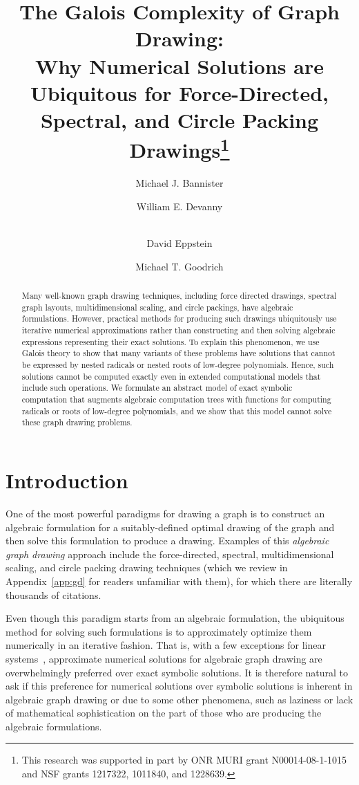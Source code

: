 \documentclass[oribibl,10pt]{llncs}
\title{The Galois Complexity of Graph Drawing:\\ 
Why Numerical Solutions are Ubiquitous
for Force-Directed, Spectral, and Circle Packing Drawings\thanks{This research was supported in part by ONR MURI grant N00014-08-1-1015 and NSF grants 1217322, 1011840, and 1228639.}}
\author{Michael J. Bannister \and William E. Devanny \and\\ David Eppstein \and Michael T. Goodrich}
\institute{Department of Computer Science, University of California, Irvine}
\begin{document}
\maketitle

\begin{abstract}
Many well-known graph drawing techniques, 
including force directed drawings, spectral graph layouts, multidimensional scaling, and circle packings, 
have algebraic formulations. However, practical methods for producing such
drawings ubiquitously use iterative numerical approximations rather than constructing and then solving algebraic expressions representing their exact solutions.
To explain this phenomenon, we use Galois theory to show that many variants of these problems have solutions that cannot be expressed by nested radicals or nested roots of low-degree polynomials.
Hence, such solutions cannot be computed exactly even in extended computational
models that include such operations.
\ifFull We formulate an abstract model of exact symbolic computation that augments algebraic computation trees with functions for computing radicals or roots of low-degree polynomials, and we show that this model cannot solve these graph drawing problems.
\fi 
\end{abstract}

\setcounter{page}{1}
\pagestyle{plain}

\section{Introduction}
One of the most powerful paradigms for drawing a graph 
is to construct an algebraic formulation for a suitably-defined optimal drawing
of the graph and then solve this formulation to produce a drawing.
Examples of this \emph{algebraic graph drawing} approach include the 
force-directed, spectral, multidimensional scaling, and circle packing
drawing techniques 
(which we review in Appendix~\ref{app:gd} for readers unfamiliar
with them)\ifFull, for which there
are literally thousands of citations\fi.

Even though this paradigm starts from an algebraic formulation,
the ubiquitous method
for solving such formulations is to approximately optimize them numerically in
an iterative fashion.
That is, with a few exceptions for linear systems~\cite{Chrobak:1996,hk-gaa-92,tutte1963draw},
approximate numerical solutions for algebraic graph drawing are overwhelmingly
preferred over exact symbolic solutions.
It is therefore natural to ask if this preference for numerical solutions 
over symbolic solutions is
inherent in algebraic graph drawing 
or due to some other phenomena, such as 
laziness or lack of mathematical sophistication on the part of those who are
producing the algebraic formulations.
\end{document}
